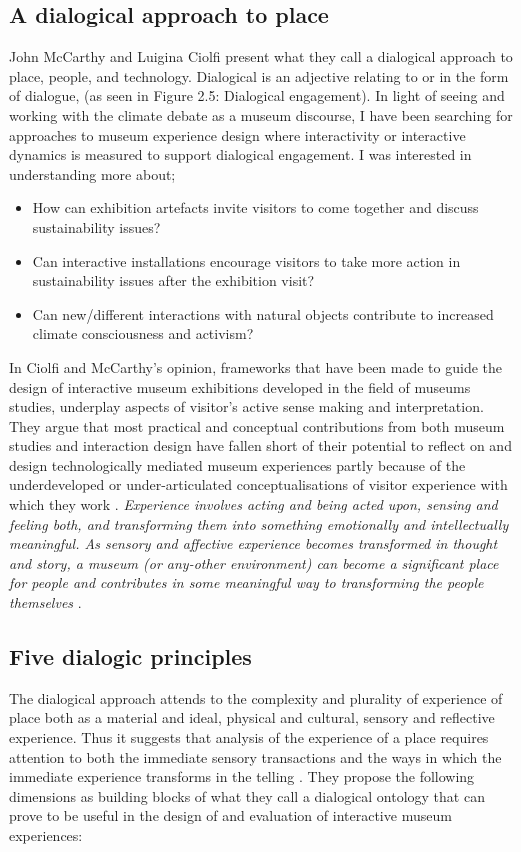 \subsection{A dialogical approach to place}
John McCarthy and Luigina Ciolfi present what they call a dialogical approach to place, people, and technology. Dialogical is an adjective relating to or in the form of dialogue, (as seen in Figure 2.5: Dialogical engagement). In light of seeing and working with the climate debate as a museum discourse, I have been searching for approaches to museum experience design where interactivity or interactive dynamics is measured to support dialogical engagement. I was interested in understanding more about;
\begin{itemize}
    \item How can exhibition artefacts invite visitors to come together and discuss sustainability issues?
    \item Can interactive installations encourage visitors to take more action in sustainability issues after the exhibition visit?
    \item Can new/different interactions with natural objects contribute to increased climate consciousness and activism?
\end{itemize}



In Ciolfi and McCarthy’s opinion, frameworks that have been made to guide the design of interactive museum exhibitions developed in the field of museums studies, underplay aspects of visitor’s active sense making and interpretation. They argue that most practical and conceptual contributions from both museum studies and interaction design have fallen short of their potential to reflect on and design technologically mediated museum experiences partly because of the underdeveloped or under-articulated conceptualisations of visitor experience with which they work \autocite[p. 248]{mccarthy_place}. \emph{Experience involves acting and being acted upon, sensing and feeling both, and transforming them into something emotionally and intellectually meaningful. As sensory and affective experience becomes transformed in thought and story, a museum (or any-other environment) can become a significant place for people and contributes in some meaningful way to transforming the people themselves} \autocite[p. 250]{mccarthy_place}.


\subsection{Five dialogic principles}
The dialogical approach attends to the complexity and plurality of experience of place both as a material and ideal, physical and cultural, sensory and reflective experience. Thus it suggests that analysis of the experience of a place requires attention to both the immediate sensory transactions and the ways in which the immediate experience transforms in the telling \autocite[p. 251]{mccarthy_place}. They propose the following dimensions as building blocks of what they call a dialogical ontology that can prove to be useful in the design of and evaluation of interactive museum experiences:

